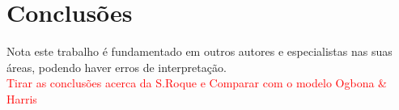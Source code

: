 {
\newpage
\section{Conclusões}
\qquad Nota este trabalho é fundamentado em outros autores e especialistas nas suas áreas, podendo haver erros de interpretação.\\

\textcolor{red}{Tirar as conclusões acerca da S.Roque e Comparar com o modelo Ogbona \& Harris}








}
